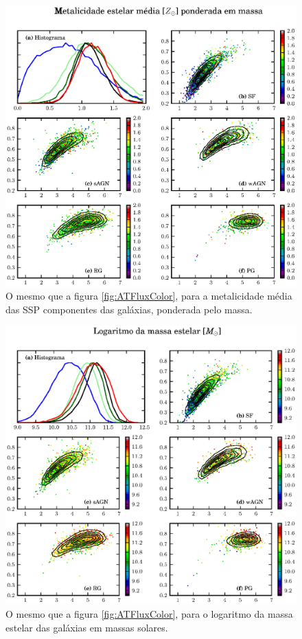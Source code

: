 \begin{figure}
	\includegraphics{figuras/uvcolor-color-am_mass-byclass.eps}
	\caption[Metalicidade média das SSP ponderada em massa no diagrama cor--cor
	UV.]
	{O mesmo que a figura \ref{fig:ATFluxColor}, para a metalicidade média das
	SSP componentes das galáxias, ponderada pelo massa.}
	\label{fig:AMMassColor}
\end{figure}

\begin{figure}
	\includegraphics{figuras/uvcolor-color-mcor_gal-byclass.eps}
	\caption[Massa estelar das galáxias no diagrama cor--cor UV.]
	{O mesmo que a figura \ref{fig:ATFluxColor}, para o logaritmo da massa estelar
	das galáxias em massas solares.}
	\label{fig:MCorGalColor}
\end{figure}

